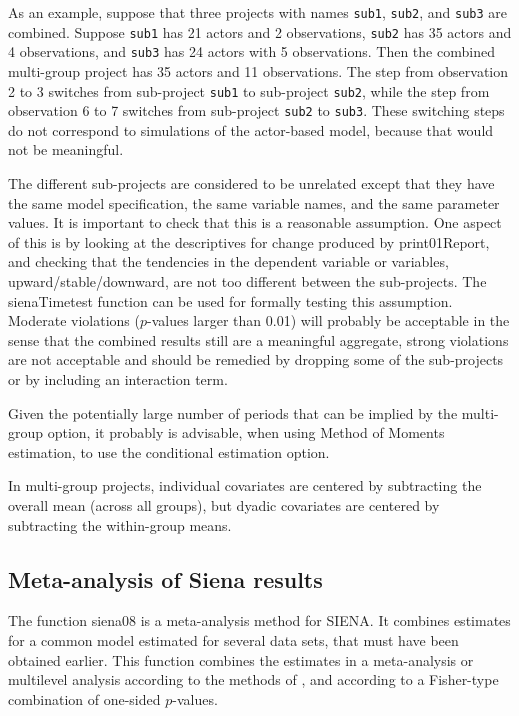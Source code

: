 \documentclass[a4paper,fleqn,11pt]{article}
\newcommand{\+}{\, + \,}
\newcommand{\si}{{\sf SIENA}}
\begin{document}
As an example, suppose that three projects with names {\tt sub1}, {\tt sub2},
and {\tt sub3} are combined. Suppose {\tt sub1} has 21 actors and
2 observations, {\tt sub2} has 35 actors and 4 observations,
and {\tt sub3} has 24 actors with 5 observations.
Then the combined multi-group project has 35 actors and 11 observations.
The step from observation 2 to 3 switches from sub-project {\tt sub1}
to sub-project {\tt sub2}, while
the step from observation 6 to 7 switches from sub-project {\tt sub2}
to {\tt sub3}. These switching steps do not correspond to simulations
of the actor-based model, because that would not be meaningful.

The different sub-projects are considered to be unrelated
except that they have the same model specification,
the same variable names, and the same parameter values.
It is important to check that this is a reasonable assumption.
One aspect of this is by looking at the descriptives for change
produced by \textsf{print01Report}, and checking that the
tendencies in the dependent variable or variables, upward/stable/downward,
are not too different between the sub-projects.
The \textsf{sienaTimetest} function can be used for
formally testing this assumption.
Moderate violations ($p$-values larger than 0.01) will probably
be acceptable in the sense that the combined results
still are a meaningful aggregate, strong violations are not acceptable
and should be remedied by dropping some of the sub-projects or by
including an interaction term.

Given the potentially large number of periods that can be implied
by the multi-group option, it probably is advisable,
when using Method of Moments estimation, to use
the conditional estimation option.

In multi-group projects, individual covariates are centered by subtracting
the overall mean (across all groups), but dyadic covariates are centered
by subtracting the within-group means.



\subsection{Meta-analysis of Siena results}
\label{S_Siena08}

The function \textsf{siena08} is a meta-analysis method for \si.
It combines estimates for a common model
   estimated for several data sets,
   that must have been obtained earlier.
   This function combines
   the estimates in a meta-analysis or multilevel analysis
   according to the methods of \citet{SnijdersBaerveldt03},
   and according to a Fisher-type combination of one-sided $p$-values.
\end{document}
